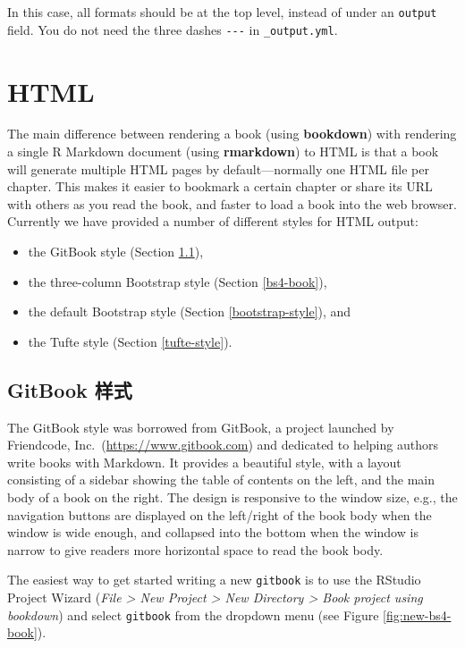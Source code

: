 \documentclass[
  12pt,
]{krantz}
\providecommand{\tightlist}{%
  \setlength{\itemsep}{0pt}\setlength{\parskip}{0pt}}
\theoremstyle{definition}
\theoremstyle{definition}
\theoremstyle{definition}
\theoremstyle{definition}
\theoremstyle{remark}
\begin{document}
In this case, all formats should be at the top level, instead of under an \texttt{output} field. You do not need the three dashes \texttt{-\/-\/-} in \texttt{\_output.yml}.

\hypertarget{html}{%
\section{HTML}\label{html}}

The main difference between rendering a book (using \textbf{bookdown}) with rendering a single R Markdown document (using \textbf{rmarkdown}) to HTML is that a book will generate multiple HTML pages by default---normally one HTML file per chapter. This makes it easier to bookmark a certain chapter or share its URL with others as you read the book, and faster to load a book into the web browser. Currently we have provided a number of different styles for HTML output:

\begin{itemize}
\tightlist
\item
  the GitBook style (Section \ref{gitbook-style}),
\item
  the three-column Bootstrap style (Section \ref{bs4-book}),
\item
  the default Bootstrap style (Section \ref{bootstrap-style}), and
\item
  the Tufte style (Section \ref{tufte-style}).
\end{itemize}

\hypertarget{gitbook-style}{%
\subsection{GitBook 样式}\label{gitbook-style}}

The GitBook style was borrowed from GitBook, a project launched by Friendcode, Inc.~(\url{https://www.gitbook.com}) and dedicated to helping authors write books with Markdown. It provides a beautiful style, with a layout consisting of a sidebar showing the table of contents on the left, and the main body of a book on the right. The design is responsive to the window size, e.g., the navigation buttons are displayed on the left/right of the book body when the window is wide enough, and collapsed into the bottom when the window is narrow to give readers more horizontal space to read the book body.

The easiest way to get started writing a new \texttt{gitbook} is to use the RStudio Project Wizard (\emph{File \textgreater{} New Project \textgreater{} New Directory \textgreater{} Book project using bookdown}) and select \texttt{gitbook} from the dropdown menu (see Figure \ref{fig:new-bs4-book}).
\end{document}
